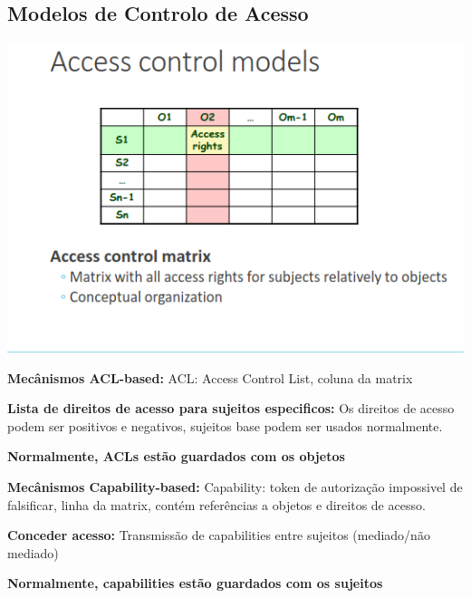 \documentclass{article}
\begin{document}
\pagebreak

\subsection{Modelos de Controlo de Acesso}

\begin{center}
  \includegraphics[scale=0.4]{14}
\end{center}

\begin{flushleft}
  \textbf{Mecânismos ACL-based:} ACL: Access Control List, coluna da matrix

  \vspace{2mm}

  \textbf{Lista de direitos de acesso para sujeitos especificos:} Os direitos de
  acesso podem ser positivos e negativos, sujeitos base podem ser usados normalmente.
  
  \vspace{2mm}

  \textbf{Normalmente, ACLs estão guardados com os objetos}

  \vspace{2mm}

  \textbf{Mecânismos Capability-based:} Capability: token de autorização impossivel
  de falsificar, linha da matrix, contém referências a objetos e direitos de acesso.

  \vspace{2mm}

  \textbf{Conceder acesso:} Transmissão de capabilities entre sujeitos (mediado/não mediado)

  \vspace{2mm}

  \textbf{Normalmente, capabilities estão guardados com os sujeitos}
\end{flushleft}
\end{document}
